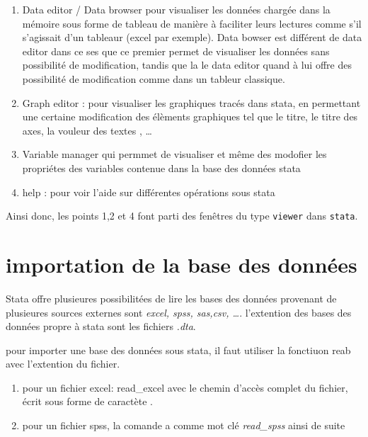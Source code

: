 \documentclass[
]{book}
\providecommand{\tightlist}{%
  \setlength{\itemsep}{0pt}\setlength{\parskip}{0pt}}
\theoremstyle{definition}
\theoremstyle{definition}
\theoremstyle{definition}
\theoremstyle{definition}
\theoremstyle{remark}
\begin{document}
\begin{enumerate}
\def\labelenumi{(\arabic{enumi})}
\tightlist
\item
  Data editor / Data browser pour visualiser les données chargée dans la mémoire sous forme de tableau de manière à faciliter leurs lectures comme s'il s'agissait d'un tableaur (excel par exemple).
  Data bowser est différent de data editor dans ce ses que ce premier permet de visualiser les données sans possibilité de modification, tandis que la le data editor quand à lui offre des possibilité de modification comme dans un tableur classique.
\item
  Graph editor : pour visualiser les graphiques tracés dans stata, en permettant une certaine modification des élèments graphiques tel que le titre, le titre des axes, la vouleur des textes , \ldots{}
\item
  Variable manager qui permmet de visualiser et même des modofier les propriétes des variables contenue dans la base des données stata
\item
  help : pour voir l'aide sur différentes opérations sous stata
\end{enumerate}

Ainsi donc, les points 1,2 et 4 font parti des fenêtres du type \texttt{viewer} dans \texttt{stata}.

\hypertarget{importation-de-la-base-des-donnuxe9es}{%
\section{importation de la base des données}\label{importation-de-la-base-des-donnuxe9es}}

Stata offre plusieures possibilitées de lire les bases des données provenant de plusieures sources externes sont \emph{excel, spss, sas,csv, \ldots{}}.
l'extention des bases des données propre à stata sont les fichiers \emph{.dta}.

pour importer une base des données sous stata, il faut utiliser la fonctiuon reab avec l'extention du fichier.

\begin{enumerate}
\def\labelenumi{(\arabic{enumi})}
\tightlist
\item
  pour un fichier excel: read\_excel avec le chemin d'accès complet du fichier, écrit sous forme de caractète .
\item
  pour un fichier spss, la comande a comme mot clé \emph{read\_spss}
  ainsi de suite
\end{enumerate}
\end{document}
